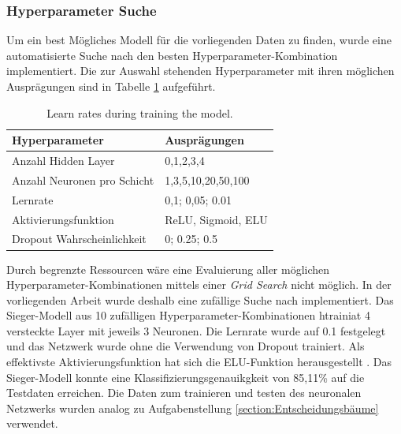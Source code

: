 \subsubsection{Hyperparameter Suche}
\label{nn_hyperparams}
Um ein best Mögliches Modell für die vorliegenden Daten zu finden, wurde eine automatisierte Suche nach den besten Hyperparameter-Kombination implementiert. Die zur Auswahl stehenden Hyperparameter mit ihren möglichen Ausprägungen sind in Tabelle \ref{table:hyper} aufgeführt.

\begin{table}[ht]
	\centering
	\begin{tabular}{ll}
		\textbf{Hyperparameter}     & \textbf{Ausprägungen} \\ \hline
		Anzahl Hidden Layer         & 0,1,2,3,4             \\
		Anzahl Neuronen pro Schicht & 1,3,5,10,20,50,100    \\
		Lernrate                    & 0,1;  0,05;  0.01     \\
		Aktivierungsfunktion        & ReLU, Sigmoid, ELU \\
		Dropout Wahrscheinlichkeit  & 0;  0.25;  0.5       
	\end{tabular}
	\caption{\label{table:hyper}Learn rates during training the model.}
\end{table}

Durch begrenzte Ressourcen wäre eine Evaluierung aller möglichen Hyperparameter-Kombinationen mittels einer \emph{Grid Search} nicht möglich. In der vorliegenden Arbeit wurde deshalb eine zufällige Suche nach \cite{randomSearch} implementiert. Das Sieger-Modell aus 10 zufälligen Hyperparameter-Kombinationen htrainiat 4 versteckte Layer mit jeweils 3 Neuronen. Die Lernrate wurde auf 0.1 festgelegt und das Netzwerk wurde ohne die Verwendung von Dropout trainiert. Als effektivste Aktivierungsfunktion hat sich die ELU-Funktion herausgestellt \cite{elu}. Das Sieger-Modell konnte eine Klassifizierungsgenauikgkeit von 85,11\% auf die Testdaten erreichen. Die Daten zum trainieren und testen des neuronalen Netzwerks wurden analog zu Aufgabenstellung \ref{section:Entscheidungsbäume} verwendet.

